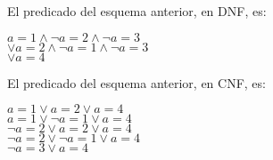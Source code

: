 \documentclass{article}
\begin{document}


El predicado del esquema anterior, en DNF, es:
\begin{center}
 $ a=1 \land \lnot a=2 \land \lnot a=3 $\\
 $ \lor a=2 \land \lnot a=1 \land \lnot a=3  $\\
 $ \lor a=4$
\end{center}


El predicado del esquema anterior, en CNF, es:
\begin{center}
 $ a=1 \lor a=2 \lor a=4 $\\
 $ a=1 \lor \lnot a=1 \lor a=4 $ \\
 $ \lnot a=2 \lor a=2 \lor a=4 $ \\
 $ \lnot a=2 \lor \lnot a=1 \lor a=4 $\\
 $ \lnot a=3 \lor a=4 $
\end{center}
\end{document}
